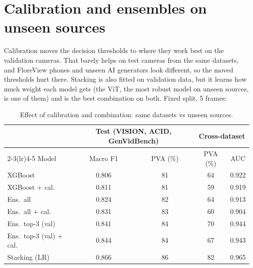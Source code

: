 \documentclass[11pt,a4paper]{article}
\begin{document}
\section{Calibration and ensembles on unseen sources}
Calibration moves the decision thresholds to where they work best on the validation cameras. That barely helps on test cameras from the same datasets, and FloreView phones and unseen AI generators look different, so the moved thresholds hurt there. Stacking is also fitted on validation data, but it learns how much weight each model gets (the ViT, the most robust model on unseen sources, is one of them) and is the best combination on both. Fixed split, 5 frames:
\begin{table}[H]\centering\small\caption{Effect of calibration and combination: same datasets vs unseen sources.}\label{tab:cal}\begin{tabular}{lcccc}\toprule & \multicolumn{2}{c}{Test (VISION, ACID, GenVidBench)} & \multicolumn{2}{c}{Cross-dataset} \\\cmidrule(lr){2-3}\cmidrule(lr){4-5} Model & Macro F1 & PVA (\%) & PVA (\%) & AUC \\\midrule
XGBoost & 0.806 & 81 & 64 & 0.922 \\
XGBoost + cal. & 0.811 & 81 & 59 & 0.919 \\
Ens.\ all & 0.824 & 82 & 64 & 0.913 \\
Ens.\ all + cal. & 0.831 & 83 & 60 & 0.904 \\
Ens.\ top-3 (val) & 0.841 & 84 & 70 & 0.944 \\
Ens.\ top-3 (val) + cal. & 0.844 & 84 & 67 & 0.943 \\
Stacking (LR) & 0.866 & 86 & 82 & 0.965 \\
\bottomrule\end{tabular}\end{table}
\end{document}
